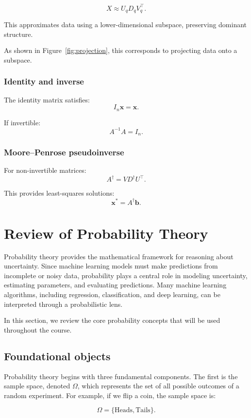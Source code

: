 \documentclass{article}
\begin{document}
\[
X \approx U_q D_q V_q^\top.
\]

This approximates data using a lower-dimensional subspace, preserving dominant structure.

As shown in Figure~\ref{fig:projection}, this corresponds to projecting data onto a subspace.

\subsubsection*{Identity and inverse}

The identity matrix satisfies:
\[
I_n \mathbf{x} = \mathbf{x}.
\]

If invertible:
\[
A^{-1}A = I_n.
\]

\subsubsection*{Moore--Penrose pseudoinverse}

For non-invertible matrices:
\[
A^\dagger = V D^\dagger U^\top.
\]

This provides least-squares solutions:
\[
\mathbf{x}^* = A^\dagger \mathbf{b}.
\]

\section{Review of Probability Theory}

Probability theory provides the mathematical framework for reasoning about uncertainty. Since machine learning models must make predictions from incomplete or noisy data, probability plays a central role in modeling uncertainty, estimating parameters, and evaluating predictions. Many machine learning algorithms, including regression, classification, and deep learning, can be interpreted through a probabilistic lens.

In this section, we review the core probability concepts that will be used throughout the course.

\subsection{Foundational objects}

Probability theory begins with three fundamental components. The first is the sample space, denoted $\Omega$, which represents the set of all possible outcomes of a random experiment. For example, if we flip a coin, the sample space is:

\[
\Omega = \{\text{Heads}, \text{Tails}\}.
\]
\end{document}
